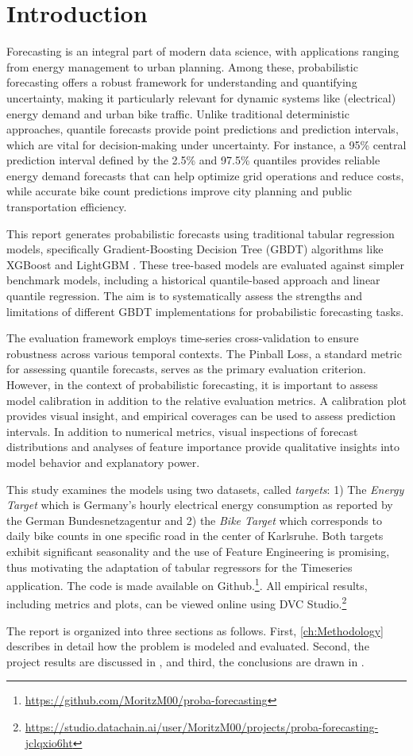 \section{Introduction}
\label{ch:Introduction}

Forecasting is an integral part of modern data science, with applications ranging from energy management to urban planning. Among these, probabilistic forecasting offers a robust framework for understanding and quantifying uncertainty, making it particularly relevant for dynamic systems like (electrical) energy demand and urban bike traffic. Unlike traditional deterministic approaches, quantile forecasts provide point predictions and prediction intervals, which are vital for decision-making under uncertainty. For instance, a 95\% central prediction interval defined by the 2.5\% and 97.5\% quantiles provides reliable energy demand forecasts that can help optimize grid operations and reduce costs, while accurate bike count predictions improve city planning and public transportation efficiency.

This report generates probabilistic forecasts using traditional tabular regression models, specifically Gradient-Boosting Decision Tree (GBDT) algorithms like XGBoost \parencite{chen_xgboost_2016} and LightGBM \parencite{ke_lightgbm_2017}. These tree-based models are evaluated against simpler benchmark models, including a historical quantile-based approach and linear quantile regression. The aim is to systematically assess the strengths and limitations of different GBDT implementations for probabilistic forecasting tasks.

The evaluation framework employs time-series cross-validation to ensure robustness across various temporal contexts. The Pinball Loss, a standard metric for assessing quantile forecasts, serves as the primary evaluation criterion. However, in the context of probabilistic forecasting, it is important to assess model calibration in addition to the relative evaluation metrics. A calibration plot provides visual insight, and empirical coverages can be used to assess prediction intervals.
In addition to numerical metrics, visual inspections of forecast distributions and analyses of feature importance provide qualitative insights into model behavior and explanatory power.

This study examines the models using two datasets, called \textit{targets}: 1) The \textit{Energy Target} which is Germany's hourly electrical energy consumption \parencite{noauthor_smard_2025} as reported by the German Bundesnetzagentur and 2) the \textit{Bike Target} which corresponds to daily bike counts in one specific road in the center of Karlsruhe. Both targets exhibit significant seasonality and the use of Feature Engineering is promising, thus motivating the adaptation of tabular regressors for the Timeseries application.
The code is made available on Github.\footnote{\href{https://github.com/MoritzM00/proba-forecasting}{https://github.com/MoritzM00/proba-forecasting}}. All empirical results, including metrics and plots, can be viewed online using DVC Studio.\footnote{\href{https://studio.datachain.ai/user/MoritzM00/projects/proba-forecasting-jclqxio6ht}{https://studio.datachain.ai/user/MoritzM00/projects/proba-forecasting-jclqxio6ht}}

The report is organized into three sections as follows. First, \cref{ch:Methodology} describes in detail how the problem is modeled and evaluated. Second, the project results are discussed in , and third, the conclusions are drawn in .